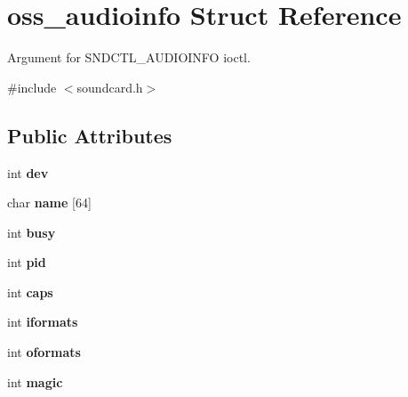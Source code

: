 \hypertarget{structoss__audioinfo}{}\section{oss\+\_\+audioinfo Struct Reference}
\label{structoss__audioinfo}


Argument for S\+N\+D\+C\+T\+L\+\_\+\+A\+U\+D\+I\+O\+I\+N\+FO ioctl.  




{\ttfamily \#include $<$soundcard.\+h$>$}

\subsection*{Public Attributes}
\begin{DoxyCompactItemize}
\item 
int {\bfseries dev}\hypertarget{structoss__audioinfo_aecf1d5b5b5b99dc683844a1959d57b4e}{}\label{structoss__audioinfo_aecf1d5b5b5b99dc683844a1959d57b4e}

\item 
char {\bfseries name} \mbox{[}64\mbox{]}\hypertarget{structoss__audioinfo_a1520b05dd37486589d6273217ddb1e71}{}\label{structoss__audioinfo_a1520b05dd37486589d6273217ddb1e71}

\item 
int {\bfseries busy}\hypertarget{structoss__audioinfo_a9302657ad6c5e610ff160d2ff665dfca}{}\label{structoss__audioinfo_a9302657ad6c5e610ff160d2ff665dfca}

\item 
int {\bfseries pid}\hypertarget{structoss__audioinfo_a07a945ed9ce6dff3985b0be198ab643a}{}\label{structoss__audioinfo_a07a945ed9ce6dff3985b0be198ab643a}

\item 
int {\bfseries caps}\hypertarget{structoss__audioinfo_a50ebc66159a1eb0869cd5bcc2e13c04a}{}\label{structoss__audioinfo_a50ebc66159a1eb0869cd5bcc2e13c04a}

\item 
int {\bfseries iformats}\hypertarget{structoss__audioinfo_afb4ff568c50df0cce58411b4070ad14d}{}\label{structoss__audioinfo_afb4ff568c50df0cce58411b4070ad14d}

\item 
int {\bfseries oformats}\hypertarget{structoss__audioinfo_a42d8ec88c5dc74855c5706f9aa50aab4}{}\label{structoss__audioinfo_a42d8ec88c5dc74855c5706f9aa50aab4}

\item 
int {\bfseries magic}\hypertarget{structoss__audioinfo_adbb7030aaff514f927f86dd9ca5fc2a9}{}\label{structoss__audioinfo_adbb7030aaff514f927f86dd9ca5fc2a9}


\end{DoxyCompactItemize}
